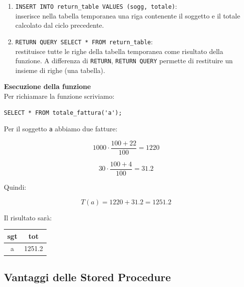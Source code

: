\begin{enumerate}
    \begin{itemize}

        \item \texttt{sgt}: contiene il soggetto (tipo \texttt{VARCHAR}).

        \item \texttt{tot}: contiene il totale calcolato (tipo \texttt{REAL}).

    \end{itemize}

    \noindent La tabella temporanea è visibile solo nella sessione corrente e viene eliminata automaticamente al termine della sessione.

    \item \texttt{INSERT INTO return\_table VALUES (sogg, totale)}:\\
     inserisce nella tabella temporanea una riga contenente il soggetto e il totale calcolato dal ciclo precedente.

    \item \texttt{RETURN QUERY SELECT * FROM return\_table}:\\
     restituisce tutte le righe della tabella temporanea come risultato della funzione. A differenza di \texttt{RETURN}, \texttt{RETURN QUERY} permette di restituire un insieme di righe (una tabella).
\end{enumerate}
\noindent \textbf{Esecuzione della funzione}\\
Per richiamare la funzione scriviamo:
\begin{verbatim}
SELECT * FROM totale_fattura('a');
\end{verbatim}
Per il soggetto \texttt{a} abbiamo due fatture:

\[
1000\cdot\frac{100+22}{100}=1220
\]

\[
30\cdot\frac{100+4}{100}=31.2
\]

Quindi:

\[
T(a)=1220+31.2=\boxed{1251.2}
\]

Il risultato sarà:

\begin{center}
\begin{tabular}{|c|c|}
\hline
sgt & tot \\
\hline
a & 1251.2 \\
\hline
\end{tabular}
\end{center}

\subsection{Vantaggi delle Stored Procedure}


